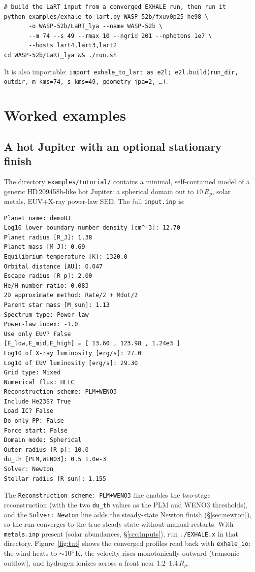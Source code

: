 \documentclass[english,a4paper]{my_memo}
\begin{document}
\begin{lstlisting}[style=sh]
# build the LaRT input from a converged EXHALE run, then run it
python examples/exhale_to_lart.py WASP-52b/fxuv0p25_he98 \
       -o WASP-52b/LaRT_lya --name WASP-52b \
       --m 74 --s 49 --rmax 10 --ngrid 201 --nphotons 1e7 \
       --hosts lart4,lart3,lart2
cd WASP-52b/LaRT_lya && ./run.sh
\end{lstlisting}
It is also importable: \texttt{import exhale\_to\_lart as e2l;
e2l.build(run\_dir, outdir, m\_kms=74, s\_kms=49, geometry\_jpa=2, \dots)}.

\section{Worked examples}\label{sec:examples}

\subsection{A hot Jupiter with an optional stationary finish}
The directory \texttt{examples/tutorial/} contains a minimal, self-contained
model of a generic HD\,209458b-like hot Jupiter: a spherical domain out to
$10\,R_p$, solar metals, EUV+X-ray power-law SED. The full \texttt{input.inp} is:
\begin{lstlisting}[style=cfg]
Planet name: demoHJ
Log10 lower boundary number density [cm^-3]: 12.70
Planet radius [R_J]: 1.38
Planet mass [M_J]: 0.69
Equilibrium temperature [K]: 1320.0
Orbital distance [AU]: 0.047
Escape radius [R_p]: 2.00
He/H number ratio: 0.083
2D approximate method: Rate/2 + Mdot/2
Parent star mass [M_sun]: 1.13
Spectrum type: Power-law
Power-law index: -1.0
Use only EUV? False
[E_low,E_mid,E_high] = [ 13.60 , 123.98 , 1.24e3 ]
Log10 of X-ray luminosity [erg/s]: 27.0
Log10 of EUV luminosity [erg/s]: 29.30
Grid type: Mixed
Numerical flux: HLLC
Reconstruction scheme: PLM+WENO3
Include He23S? True
Load IC? False
Do only PP: False
Force start: False
Domain mode: Spherical
Outer radius [R_p]: 10.0
du_th [PLM,WENO3]: 0.5 1.0e-3
Solver: Newton
Stellar radius [R_sun]: 1.155
\end{lstlisting}
The \texttt{Reconstruction scheme: PLM+WENO3} line enables the two-stage
reconstruction (with the two \texttt{du\_th} values as the PLM and WENO3
thresholds), and the \texttt{Solver: Newton} line adds the steady-state Newton
finish (\S\ref{sec:newton}), so the run converges to the true steady state
without manual restarts. With \texttt{metals.inp} present (solar
abundances, \S\ref{sec:inputs}), run
\texttt{./EXHALE.x} in that directory. Figure~\ref{fig:tut} shows the converged
profiles read back with \texttt{exhale\_io}: the wind heats to $\sim10^4$\,K, the
velocity rises monotonically outward (transonic outflow), and hydrogen ionizes
across a front near $1.2$--$1.4\,R_p$.
\end{document}
